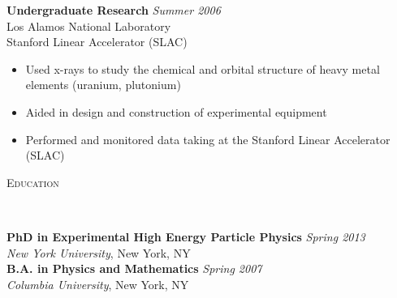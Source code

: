 \documentclass[9pt]{article}
\newenvironment{changemargin}[2]{%
  \begin{list}{}{%
    \setlength{\topsep}{0pt}%
    \setlength{\leftmargin}{#1}%
    \setlength{\rightmargin}{#2}%
    \setlength{\listparindent}{\parindent}%
    \setlength{\itemindent}{\parindent}%
    \setlength{\parsep}{\parskip}%
  }%
  \item[]}{\end{list}
}
\newcommand{\lineover}{
	\begin{changemargin}{-0.05in}{-0.05in}
		\vspace*{-8pt}
		\hrulefill \\
		\vspace*{-2pt}
	\end{changemargin}
}
\newcommand{\header}[1]{
	\begin{changemargin}{-0.5in}{-0.5in}
		\scshape{#1}\\
  	\lineover
	\end{changemargin}
}
\newenvironment{body} {
	\vspace*{-16pt}
	\begin{changemargin}{-0.25in}{-0.5in}
  }	
	{\end{changemargin}
}
\begin{document}
\begin{body}
\begin{itemize}


        \end{itemize}


        \medskip

	\textbf {Undergraduate Research} \hfill \emph{Summer 2006}\\
        Los Alamos National Laboratory \\
        Stanford Linear Accelerator (SLAC) \\

        \begin{itemize}
          \item Used x-rays to study the chemical and orbital structure of heavy metal elements (uranium, plutonium)
          \item Aided in design and construction of experimental equipment
          \item Performed and monitored data taking at the Stanford Linear Accelerator (SLAC) 
        \end{itemize}

\end{body}

\header{Education}

\begin{body}
	\vspace{14pt}
	\textbf{PhD in Experimental High Energy Particle Physics }{} \hfill \emph{Spring 2013}{} \\
	\emph{New York University}, New York, NY{} \\
  \medskip
	\textbf{B.A. in Physics and Mathematics} \hfill \emph{Spring 2007} \\
	\emph{Columbia University}, New York, NY\\
\end{body}
\end{document}
